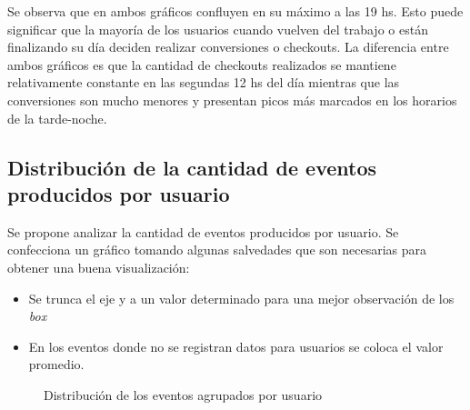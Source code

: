 \documentclass[a4paper]{article}
\begin{document}
Se observa que en ambos gráficos confluyen en su máximo a las 19 hs. Esto puede significar que la mayoría de los usuarios cuando vuelven del trabajo o están finalizando su día deciden realizar conversiones o checkouts. La diferencia entre ambos gráficos es que la cantidad de checkouts realizados se mantiene relativamente constante en las segundas 12 hs del día mientras que las conversiones son mucho menores y presentan picos más marcados en los horarios de la tarde-noche. 

\subsection{Distribución de la cantidad de eventos producidos por usuario}

Se propone analizar la cantidad de eventos producidos por usuario. Se confecciona un gráfico tomando algunas salvedades que son necesarias para obtener una buena visualización:

\begin{itemize}
	\item Se trunca el eje y a un valor determinado para una mejor observación de los \textit{box}
	\item En los eventos donde no se registran datos para usuarios se coloca el valor promedio.
\end{itemize}


\begin{figure}[h!]
	\caption{Distribución de los eventos agrupados por usuario}
	\label{fig:boxplot}
\end{figure}
\end{document}
